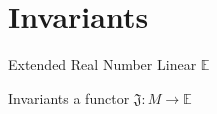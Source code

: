 \chapter{Invariants}

\begin{definition}{Extended Real Number Linear}{}
$\mathbb{E}$
\end{definition}

\begin{definition}{Invariants}{}
a functor $\mathfrak{J}: M \to \mathbb{E}$
\end{definition}